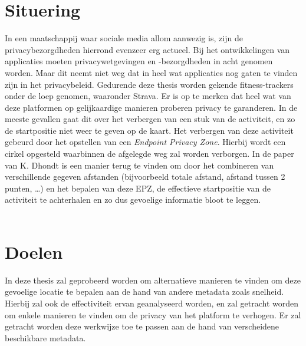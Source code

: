 
\section{Situering}
In een maatschappij waar sociale media allom aanwezig is, zijn de
privacybezorgdheden hierrond evenzeer erg actueel. Bij het ontwikkelingen van
applicaties moeten privacywetgevingen en -bezorgdheden in acht genomen worden.
Maar dit neemt niet weg dat in heel wat applicaties nog gaten te vinden zijn in
het privacybeleid. Gedurende deze thesis worden gekende fitness-trackers onder
de loep genomen, waaronder Strava. Er is op te merken dat heel wat van deze
platformen op gelijkaardige manieren proberen privacy te garanderen. In de
meeste gevallen gaat dit over het verbergen van een stuk van de activiteit, en
zo de startpositie niet weer te geven op de kaart. Het verbergen van deze
activiteit gebeurd door het opstellen van een \textit{Endpoint Privacy Zone}.
Hierbij wordt een cirkel opgesteld waarbinnen de afgelegde weg zal worden
verborgen. In de paper van K. Dhondt is een manier terug te vinden om door het
combineren van verschillende gegeven afstanden (bijvoorbeeld totale afstand,
afstand tussen 2 punten, \ldots) en het bepalen van deze EPZ, de effectieve
startpositie van de activiteit te achterhalen en zo dus gevoelige informatie
bloot te leggen. \\ \\

\section{Doelen}
In deze thesis zal geprobeerd worden om alternatieve manieren te vinden om deze
gevoelige locatie te bepalen aan de hand van andere metadata zoals snelheid.
Hierbij zal ook de effectiviteit ervan geanalyseerd worden, en zal getracht
worden om enkele manieren te vinden om de privacy van het platform te verhogen.
Er zal getracht worden deze werkwijze toe te passen aan de hand van
verscheidene beschikbare metadata.